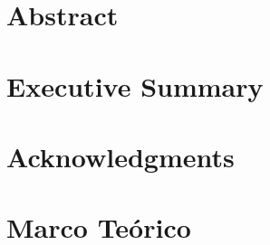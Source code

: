 \documentclass[12pt, oneside]{book}
\begin{document}
\chapter{Abstract}

\chapter{Executive Summary}


\chapter{Acknowledgments}


\tableofcontents

\listoffigures

\mainmatter



\chapter{Marco Teórico}

% 



% 
\end{document}
